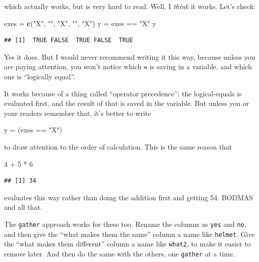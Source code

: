 \documentclass[]{tufte-book}
\newenvironment{Shaded}{}{}
\newcommand{\DecValTok}[1]{\textcolor[rgb]{0.25,0.63,0.44}{#1}}
\newcommand{\KeywordTok}[1]{\textcolor[rgb]{0.00,0.44,0.13}{\textbf{#1}}}
\newcommand{\NormalTok}[1]{#1}
\newcommand{\OperatorTok}[1]{\textcolor[rgb]{0.40,0.40,0.40}{#1}}
\newcommand{\StringTok}[1]{\textcolor[rgb]{0.25,0.44,0.63}{#1}}
\theoremstyle{definition}
\theoremstyle{definition}
\theoremstyle{definition}
\theoremstyle{remark}
\begin{document}
which actually works, but is very hard to read. Well, I \emph{think} it
works. Let's check:

\begin{Shaded}
\begin{Highlighting}[]
\NormalTok{exes =}\StringTok{ }\KeywordTok{c}\NormalTok{(}\StringTok{"X"}\NormalTok{, }\StringTok{""}\NormalTok{, }\StringTok{"X"}\NormalTok{, }\StringTok{""}\NormalTok{, }\StringTok{"X"}\NormalTok{)}
\NormalTok{y =}\StringTok{ }\NormalTok{exes }\OperatorTok{==}\StringTok{ "X"}
\NormalTok{y}
\end{Highlighting}
\end{Shaded}

\begin{verbatim}
## [1]  TRUE FALSE  TRUE FALSE  TRUE
\end{verbatim}

Yes it does. But I would never recommend writing it this way, because
unless you are paying attention, you won't notice which \texttt{=} is
saving in a variable, and which one is ``logically equal''.

It works because of a thing called ``operator precedence'': the
logical-equals is evaluated first, and the result of that is saved in
the variable. But unless you or your readers remember that, it's better
to write

\begin{Shaded}
\begin{Highlighting}[]
\NormalTok{y =}\StringTok{ }\NormalTok{(exes }\OperatorTok{==}\StringTok{ "X"}\NormalTok{)}
\end{Highlighting}
\end{Shaded}

to draw attention to the order of calculation. This is the same reason
that

\begin{Shaded}
\begin{Highlighting}[]
\DecValTok{4} \OperatorTok{+}\StringTok{ }\DecValTok{5} \OperatorTok{*}\StringTok{ }\DecValTok{6}
\end{Highlighting}
\end{Shaded}

\begin{verbatim}
## [1] 34
\end{verbatim}

evaluates this way rather than doing the addition first and getting 54.
BODMAS and all that.

The \texttt{gather} approach works for these too. Rename the columns as
\texttt{yes} and \texttt{no}, and then give the ``what makes them the
same'' column a name like \texttt{helmet}. Give the ``what makes them
different'' column a name like \texttt{what2}, to make it easier to
remove later. And then do the same with the others, one \texttt{gather}
at a time.
\end{document}
